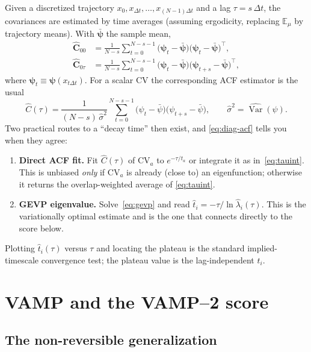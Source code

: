\documentclass[11pt]{article}
\theoremstyle{plain}
\theoremstyle{definition}
\newcommand{\E}{\mathbb{E}}
\newcommand{\Cmat}{\mathbf{C}}
\DeclareMathOperator{\Var}{Var}
\begin{document}
Given a discretized trajectory $x_0,x_{\Delta t},\dots,x_{(N-1)\Delta t}$ and a lag
$\tau=s\,\Delta t$, the covariances are estimated by time averages (assuming
ergodicity, replacing $\E_\mu$ by trajectory means). With $\bar{\bm\psi}$ the sample
mean,
\begin{align}
\widehat{\Cmat}_{00}
&=\frac{1}{N-s}\sum_{t=0}^{N-s-1}
\big(\bm\psi_t-\bar{\bm\psi}\big)\big(\bm\psi_t-\bar{\bm\psi}\big)^\top, \\
\widehat{\Cmat}_{0\tau}
&=\frac{1}{N-s}\sum_{t=0}^{N-s-1}
\big(\bm\psi_t-\bar{\bm\psi}\big)\big(\bm\psi_{t+s}-\bar{\bm\psi}\big)^\top,
\end{align}
where $\bm\psi_t\equiv\bm\psi(x_{t\Delta t})$. For a scalar CV the corresponding ACF
estimator is the usual
\begin{equation}
\widehat C(\tau)=\frac{1}{(N-s)\,\widehat\sigma^2}
\sum_{t=0}^{N-s-1}\big(\psi_t-\bar\psi\big)\big(\psi_{t+s}-\bar\psi\big),
\qquad \widehat\sigma^2=\widehat{\Var}(\psi).
\label{eq:acf-est}
\end{equation}
Two practical routes to a ``decay time'' then exist, and \eqref{eq:diag-acf} tells you
when they agree:
\begin{enumerate}[leftmargin=2em,itemsep=2pt]
\item \textbf{Direct ACF fit.} Fit $\widehat C(\tau)$ of CV$_a$ to $e^{-\tau/t_a}$ or
integrate it as in~\eqref{eq:tauint}. This is unbiased \emph{only} if CV$_a$ is
already (close to) an eigenfunction; otherwise it returns the overlap-weighted
average of \eqref{eq:tauint}.
\item \textbf{GEVP eigenvalue.} Solve~\eqref{eq:gevp} and read
$\hat t_i=-\tau/\ln\hat\lambda_i(\tau)$. This is the variationally optimal estimate
and is the one that connects directly to the score below.
\end{enumerate}
Plotting $\hat t_i(\tau)$ versus $\tau$ and locating the plateau is the standard
implied-timescale convergence test; the plateau value is the lag-independent $t_i$.

\section{VAMP and the VAMP--2 score}
\label{sec:vamp}

\subsection{The non-reversible generalization}
\end{document}
